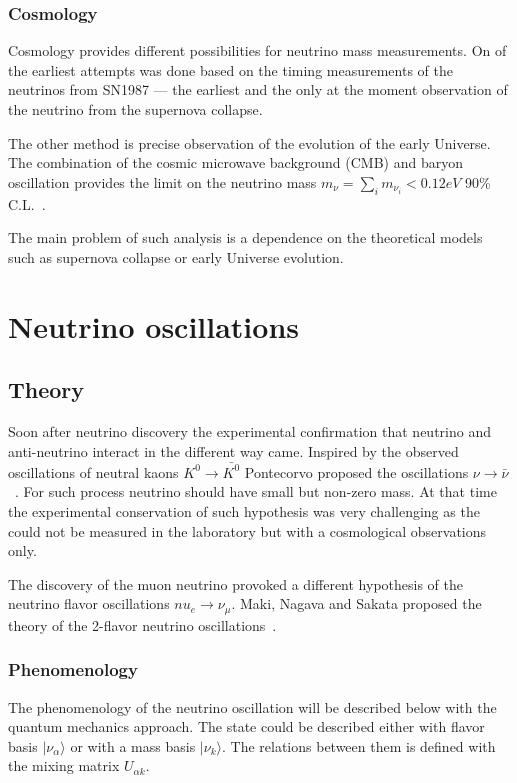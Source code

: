 \documentclass[../main.tex]{subfiles}
\begin{document}
\subsubsection{Cosmology}
Cosmology provides different possibilities for neutrino mass measurements. On of the earliest attempts was done based on the timing measurements of the neutrinos from SN1987 --- the earliest and the only at the moment observation of the neutrino from the supernova collapse.

The other method is precise observation of the evolution of the early Universe. The combination of the cosmic microwave background (CMB) and baryon oscillation provides the limit on the neutrino mass $m_\nu=\sum_i m_{\nu_i}<0.12eV$ 90\% C.L.~\cite{Palanque-Delabrouille2015}.

The main problem of such analysis is a dependence on the theoretical models such as supernova collapse or early Universe evolution.

\section{Neutrino oscillations}
\label{sec:osc}

\subsection{Theory}
Soon after neutrino discovery the experimental confirmation that neutrino and anti-neutrino interact in the different way came. Inspired by the observed oscillations of neutral kaons $K^0\to\bar{K^0}$ Pontecorvo proposed the oscillations $\nu\to\bar\nu$~\cite{Pontecorvo1957}. For such process neutrino should have small but non-zero mass. At that time the experimental conservation of such hypothesis was very challenging as the could not be measured in the laboratory but with a cosmological observations only.

The discovery of the muon neutrino provoked a different hypothesis of the neutrino flavor oscillations $nu_e\to\nu_\mu$. Maki, Nagava and Sakata proposed the theory of the 2-flavor neutrino oscillations~\cite{Maki1962}.

\subsubsection{Phenomenology}
The phenomenology of the neutrino oscillation will be described below with the quantum mechanics approach. The state could be described either with flavor basis $\lvert\nu_\alpha\rangle$ or with a mass basis $\lvert\nu_k\rangle$. The relations between them is defined with the mixing matrix $U_{\alpha k}$.
\end{document}
